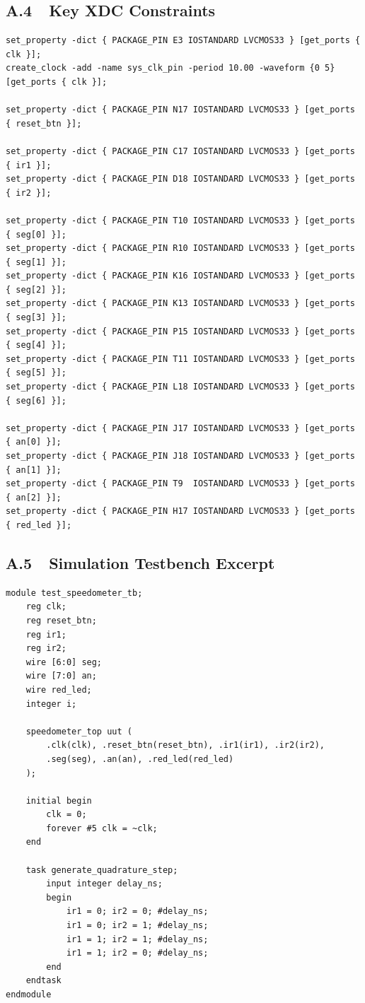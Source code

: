 \documentclass[conference,a4paper]{IEEEtran}
\begin{document}
\subsection*{A.4\ \ Key XDC Constraints}
\begin{lstlisting}[language={}]
set_property -dict { PACKAGE_PIN E3 IOSTANDARD LVCMOS33 } [get_ports { clk }];
create_clock -add -name sys_clk_pin -period 10.00 -waveform {0 5} [get_ports { clk }];

set_property -dict { PACKAGE_PIN N17 IOSTANDARD LVCMOS33 } [get_ports { reset_btn }];

set_property -dict { PACKAGE_PIN C17 IOSTANDARD LVCMOS33 } [get_ports { ir1 }];
set_property -dict { PACKAGE_PIN D18 IOSTANDARD LVCMOS33 } [get_ports { ir2 }];

set_property -dict { PACKAGE_PIN T10 IOSTANDARD LVCMOS33 } [get_ports { seg[0] }];
set_property -dict { PACKAGE_PIN R10 IOSTANDARD LVCMOS33 } [get_ports { seg[1] }];
set_property -dict { PACKAGE_PIN K16 IOSTANDARD LVCMOS33 } [get_ports { seg[2] }];
set_property -dict { PACKAGE_PIN K13 IOSTANDARD LVCMOS33 } [get_ports { seg[3] }];
set_property -dict { PACKAGE_PIN P15 IOSTANDARD LVCMOS33 } [get_ports { seg[4] }];
set_property -dict { PACKAGE_PIN T11 IOSTANDARD LVCMOS33 } [get_ports { seg[5] }];
set_property -dict { PACKAGE_PIN L18 IOSTANDARD LVCMOS33 } [get_ports { seg[6] }];

set_property -dict { PACKAGE_PIN J17 IOSTANDARD LVCMOS33 } [get_ports { an[0] }];
set_property -dict { PACKAGE_PIN J18 IOSTANDARD LVCMOS33 } [get_ports { an[1] }];
set_property -dict { PACKAGE_PIN T9  IOSTANDARD LVCMOS33 } [get_ports { an[2] }];
set_property -dict { PACKAGE_PIN H17 IOSTANDARD LVCMOS33 } [get_ports { red_led }];
\end{lstlisting}

\subsection*{A.5\ \ Simulation Testbench Excerpt}
\begin{lstlisting}
module test_speedometer_tb;
    reg clk;
    reg reset_btn;
    reg ir1;
    reg ir2;
    wire [6:0] seg;
    wire [7:0] an;
    wire red_led;
    integer i;

    speedometer_top uut (
        .clk(clk), .reset_btn(reset_btn), .ir1(ir1), .ir2(ir2),
        .seg(seg), .an(an), .red_led(red_led)
    );

    initial begin
        clk = 0;
        forever #5 clk = ~clk;
    end

    task generate_quadrature_step;
        input integer delay_ns;
        begin
            ir1 = 0; ir2 = 0; #delay_ns;
            ir1 = 0; ir2 = 1; #delay_ns;
            ir1 = 1; ir2 = 1; #delay_ns;
            ir1 = 1; ir2 = 0; #delay_ns;
        end
    endtask
endmodule
\end{lstlisting}
\end{document}
